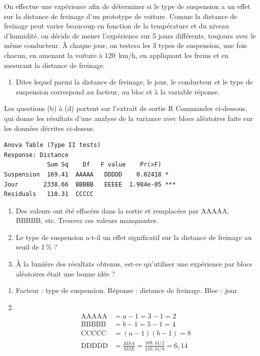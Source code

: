 \begin{exercice}
On effectue une expérience afin de déterminer si le type de suspension a un effet sur la
distance de freinage d'un prototype de voiture. Comme la distance de freinage peut varier
beaucoup en fonction de la température et du niveau d'humidité, on décide de mener
l'expérience sur 5 jours différents, toujours avec le même conducteur. À chaque jour, on
testera les 3 types de suspension, une fois chacun, en amenant la voiture à 120~km/h, en
appliquant les freins et en mesurant la distance de freinage.
\begin{enumerate}[label=(\alph*)]
  \item Dites lequel parmi la distance de freinage, le jour, le conducteur et le type de
  suspension correspond au facteur, au bloc et à la variable réponse.
\end{enumerate}
Les questions (b) à (d) portent sur l'extrait de sortie R Commander ci-dessous, qui donne
les résultats d'une analyse de la variance avec blocs aléatoires faite sur les données
décrites ci-dessus.
\begin{verbatim}
Anova Table (Type II tests)
Response: Distance
            Sum Sq    Df   F value    Pr(>F)
Suspension  169.41  AAAAA   DDDDD    0.02418 *
Jour       2338.66  BBBBB   EEEEE  1.984e-05 ***
Residuals   110.31  CCCCC
\end{verbatim}
\begin{enumerate}[label=(\alph*),resume]
  \item Des valeurs ont été effacées dans la sortie et remplacées par AAAAA, BBBBB, etc.
  Trouvez ces valeurs manquantes.
  \item Le type de suspension a-t-il un effet significatif sur la distance de freinage au
  seuil de 1\,\% ?
  \item À la lumière des résultats obtenus, est-ce qu'utiliser une expérience par blocs
  aléatoires était une bonne idée ?
\end{enumerate}
\begin{solution}
\begin{enumerate}[label=(\alph*)]
  \item Facteur : type de suspension. Réponse : distance de freinage. Bloc : jour.
  \item ~
  \begin{align*}
    \text{AAAAA}&=a-1=3-1=2\\
    \text{BBBBB}&=b-1=5-1=4\\
    \text{CCCCC}&=(a-1)(b-1)=8\\
    \text{DDDDD}&=\frac{MSA}{MSE}=\frac{169,41/2}{110,31/8}=6,14\\

\end{align*}
\end{enumerate}
\end{solution}
\end{exercice}
